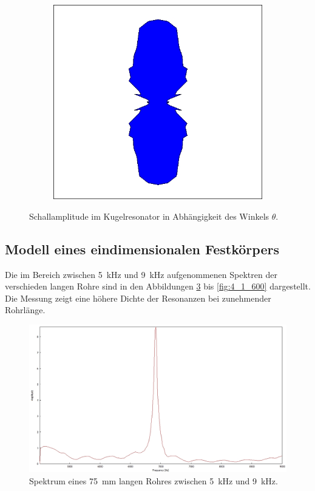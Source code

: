 \begin{figure}
\begin{subfigure}{0.4\textwidth}
\includegraphics[width=\textwidth]{content/messungen/Chapter2new/2_3_5.jpg}
\label{fig:2_3_5}
\end{subfigure}
\caption{Schallamplitude im Kugelresonator in Abhängigkeit des Winkels $\theta$.}
\end{figure}
\FloatBarrier
\subsection{Modell eines eindimensionalen Festkörpers}
\label{subsec:Modell eines eindimensionalen Festkörpers}
Die im Bereich zwischen 5~kHz und 9~kHz aufgenommenen Spektren der verschieden langen Rohre sind in den Abbildungen \ref{fig:4_1_75} bis \ref{fig:4_1_600} dargestellt.
Die Messung zeigt eine höhere Dichte der Resonanzen bei zunehmender Rohrlänge.
\begin{figure}
\centering
\includegraphics[width=1\textwidth]{content/messungen/Chapter4/4_1_75mm.jpg}
\caption{Spektrum eines 75~mm langen Rohres zwischen 5~kHz und 9~kHz.}
\label{fig:4_1_75}
\end{figure}

